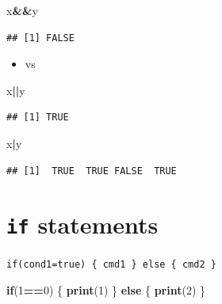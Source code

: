 \documentclass[]{book}
\newenvironment{Shaded}{\begin{snugshade}}{\end{snugshade}}
\newcommand{\KeywordTok}[1]{\textcolor[rgb]{0.13,0.29,0.53}{\textbf{#1}}}
\newcommand{\DecValTok}[1]{\textcolor[rgb]{0.00,0.00,0.81}{#1}}
\newcommand{\ControlFlowTok}[1]{\textcolor[rgb]{0.13,0.29,0.53}{\textbf{#1}}}
\newcommand{\OperatorTok}[1]{\textcolor[rgb]{0.81,0.36,0.00}{\textbf{#1}}}
\newcommand{\NormalTok}[1]{#1}
\providecommand{\tightlist}{%
  \setlength{\itemsep}{0pt}\setlength{\parskip}{0pt}}
\begin{document}
\begin{Shaded}
\begin{Highlighting}[]
\NormalTok{x}\OperatorTok{&&}\NormalTok{y}
\end{Highlighting}
\end{Shaded}

\begin{verbatim}
## [1] FALSE
\end{verbatim}

\begin{itemize}
\tightlist
\item
  \texttt{\textbar{}\textbar{}} vs \texttt{\textbar{}}
\end{itemize}

\begin{Shaded}
\begin{Highlighting}[]
\NormalTok{x}\OperatorTok{||}\NormalTok{y}
\end{Highlighting}
\end{Shaded}

\begin{verbatim}
## [1] TRUE
\end{verbatim}

\begin{Shaded}
\begin{Highlighting}[]
\NormalTok{x}\OperatorTok{|}\NormalTok{y}
\end{Highlighting}
\end{Shaded}

\begin{verbatim}
## [1]  TRUE  TRUE FALSE  TRUE
\end{verbatim}

\section{\texorpdfstring{\texttt{if}
statements}{if statements}}\label{if-statements}

\texttt{if(cond1=true)\ \{\ cmd1\ \}\ else\ \{\ cmd2\ \}}

\begin{Shaded}
\begin{Highlighting}[]
\ControlFlowTok{if}\NormalTok{(}\DecValTok{1}\OperatorTok{==}\DecValTok{0}\NormalTok{) \{}
    \KeywordTok{print}\NormalTok{(}\DecValTok{1}\NormalTok{)}
\NormalTok{\} }\ControlFlowTok{else}\NormalTok{ \{}
    \KeywordTok{print}\NormalTok{(}\DecValTok{2}\NormalTok{)}
\NormalTok{\}}
\end{Highlighting}
\end{Shaded}
\end{document}
